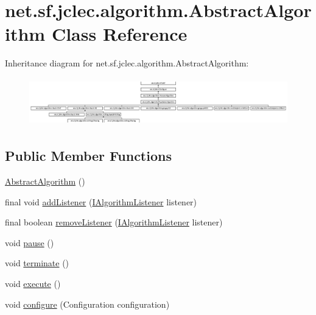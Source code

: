 \hypertarget{classnet_1_1sf_1_1jclec_1_1algorithm_1_1_abstract_algorithm}{\section{net.\-sf.\-jclec.\-algorithm.\-Abstract\-Algorithm Class Reference}
\label{classnet_1_1sf_1_1jclec_1_1algorithm_1_1_abstract_algorithm}
}
Inheritance diagram for net.\-sf.\-jclec.\-algorithm.\-Abstract\-Algorithm\-:\begin{figure}[H]
\begin{center}
\leavevmode
\includegraphics[height=2.097378cm]{classnet_1_1sf_1_1jclec_1_1algorithm_1_1_abstract_algorithm}
\end{center}
\end{figure}
\subsection*{Public Member Functions}
\begin{DoxyCompactItemize}
\item 
\hyperlink{classnet_1_1sf_1_1jclec_1_1algorithm_1_1_abstract_algorithm_ac2e5c4ea357824558d6c3bbb0bce0f73}{Abstract\-Algorithm} ()
\item 
final void \hyperlink{classnet_1_1sf_1_1jclec_1_1algorithm_1_1_abstract_algorithm_a3c148de7a175a933c9b2b75d93bb8983}{add\-Listener} (\hyperlink{interfacenet_1_1sf_1_1jclec_1_1_i_algorithm_listener}{I\-Algorithm\-Listener} listener)
\item 
final boolean \hyperlink{classnet_1_1sf_1_1jclec_1_1algorithm_1_1_abstract_algorithm_af18598a2578b59b0eafaf93a0fdbd0f7}{remove\-Listener} (\hyperlink{interfacenet_1_1sf_1_1jclec_1_1_i_algorithm_listener}{I\-Algorithm\-Listener} listener)
\item 
void \hyperlink{classnet_1_1sf_1_1jclec_1_1algorithm_1_1_abstract_algorithm_a0c0f69d801c64f6ebbab577916b6afe7}{pause} ()
\item 
void \hyperlink{classnet_1_1sf_1_1jclec_1_1algorithm_1_1_abstract_algorithm_a5ac6c8aaf7cba84ea5d8f2cdce3c2e35}{terminate} ()
\item 
void \hyperlink{classnet_1_1sf_1_1jclec_1_1algorithm_1_1_abstract_algorithm_a3c98847b0344873515d5c789f2989bd6}{execute} ()
\item 
void \hyperlink{classnet_1_1sf_1_1jclec_1_1algorithm_1_1_abstract_algorithm_a3322daabec936383c2cfb639b8e7b30b}{configure} (Configuration configuration)
\end{DoxyCompactItemize}

